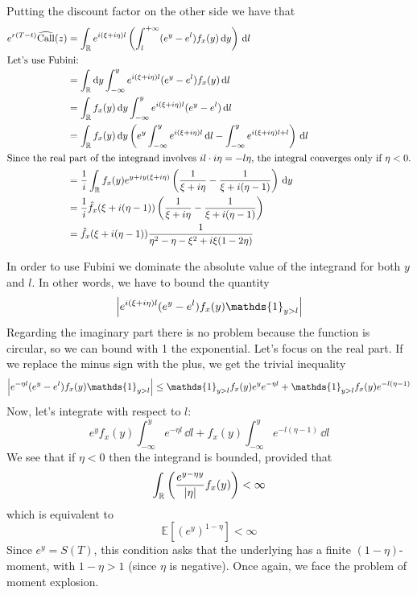 Putting the discount factor on the other side we have that
\begin{align*}
    e^{r(T-t)}\widehat{\operatorname{Call}}(z) &= \int_{\mathbb{R}} e^{i(\xi+i\eta)l} \left( \int_{l}^{+\infty} (e^y - e^l)f_x(y)\,\dd y \right)\,\dd l \\
    \intertext{Let's use Fubini:}
    &=
    \int_{\mathbb{R}}\dd y \int_{-\infty}^y e^{i(\xi+i\eta)l} (e^y - e^l)f_x(y)\,\dd l \\
    &=
    \int_{\mathbb{R}}f_x(y)\,\dd y \int_{-\infty}^y e^{i(\xi+i\eta)l} (e^y - e^l)\,\dd l \\
    &=
    \int_{\mathbb{R}}f_x(y)\,\dd y \left(e^y \int_{-\infty}^y e^{i(\xi+i\eta)l}\,\dd l - \int_{-\infty}^y e^{i(\xi+i\eta)l + l}\right)\,\dd l \\
    \intertext{Since the real part of the integrand involves $il\cdot i\eta = -l\eta$, the integral converges only if $\eta<0$.}
    &=
    \frac{1}{i} \int_{\mathbb{R}}f_x(y) e^{y + iy(\xi+i\eta)}\left(\frac{1}{\xi+i\eta} - \frac{1}{\xi+i(\eta-1)}\right)\,\dd y \\
    &=
    \frac{1}{i} \hat{f}_x(\xi+i(\eta-1))\left(\frac{1}{\xi+i\eta} - \frac{1}{\xi+i(\eta-1)}\right) \\
    &=
    \hat{f}_x(\xi+i(\eta-1))\frac{1}{\eta^2-\eta-\xi^2+i\xi(1-2\eta)}
\end{align*}
\begin{remark}
    In order to use Fubini we dominate the absolute value of the integrand for both $y$ and $l$. In other words, we have to bound the quantity
    \begin{equation*}
        \abs{e^{i(\xi+i\eta)l} (e^y - e^l)f_x(y)\mathds{1}_{y>l}}
    \end{equation*}
    Regarding the imaginary part there is no problem because the function is circular, so we can bound with 1 the exponential. Let's focus on the real part. If we replace the minus sign with the plus, we get the trivial inequality
    \begin{equation*}
        \abs{e^{-\eta l} (e^y - e^l)f_x(y)\mathds{1}_{y>l}} \le \mathds{1}_{y>l}f_x(y)e^ye^{-\eta l} + \mathds{1}_{y>l}f_x(y)e^{-l(\eta-1)}
    \end{equation*}
    Now, let's integrate with respect to $l$:
    \begin{equation*}
        e^y f_x(y) \int_{-\infty}^y e^{-\eta l}\,\dd l + f_x(y) \int_{-\infty}^y e^{-l(\eta-1)}\,\dd l
    \end{equation*}
    We see that if $\eta<0$ then the integrand is bounded, provided that
    \begin{equation*}
        \int_{\mathbb{R}}\left(\frac{e^{y-\eta y}}{\abs{\eta}}f_x(y)\right) < \infty
    \end{equation*}
    which is equivalent to
    \begin{equation*}
        \mathbb{E}\left[(e^y)^{1-\eta}\right] < \infty
    \end{equation*}
    Since $e^y = S(T)$, this condition asks that the underlying has a finite $(1-\eta)$-moment, with $1-\eta>1$ (since $\eta$ is negative). Once again, we face the problem of moment explosion.
\end{remark}
